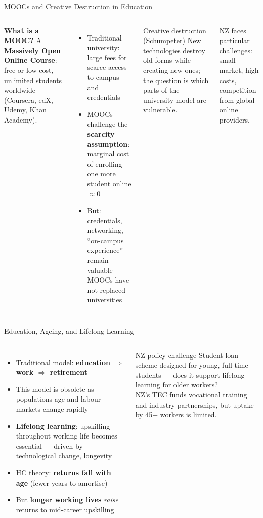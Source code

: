 \documentclass[aspectratio=169, 12pt]{beamer}
\begin{document}
\begin{frame}{MOOCs and Creative Destruction in Education}
  \begin{columns}
      \footnotesize \textbf{What is a MOOC?} A \textbf{Massively Open Online Course}: free or
      low-cost, unlimited students worldwide (Coursera, edX, Udemy, Khan Academy).
      \begin{itemize}
        \item Traditional university: large fees for scarce access to campus and credentials
        \item MOOCs challenge the \textbf{scarcity assumption}: marginal cost of enrolling
              one more student online $\approx 0$
        \item But: credentials, networking, ``on-campus experience'' remain valuable ---
              MOOCs have not replaced universities
      \end{itemize}
      \begin{alertblock}{Creative destruction (Schumpeter)}
        \footnotesize New technologies destroy old forms while creating new ones; the question is
        which parts of the university model are vulnerable.
      \end{alertblock}
      \vspace{0.2em}
      \footnotesize NZ faces particular challenges: small market, high costs, competition
      from global online providers.
  \end{columns}
\end{frame}

\begin{frame}{Education, Ageing, and Lifelong Learning}
  \begin{columns}
      \footnotesize
      \begin{itemize}
        \item Traditional model: \textbf{education $\Rightarrow$ work $\Rightarrow$ retirement}
        \item This model is obsolete as populations age and labour markets change rapidly
        \item \textbf{Lifelong learning}: upskilling throughout working life becomes essential
              --- driven by technological change, longevity
        \item HC theory: \textbf{returns fall with age} (fewer years to amortise)
        \item But \textbf{longer working lives} \emph{raise} returns to mid-career upskilling
      \end{itemize}
      \begin{alertblock}{NZ policy challenge}
        \footnotesize Student loan scheme designed for young, full-time students --- does it
        support lifelong learning for older workers?\\[0.2em]
        NZ's TEC funds vocational training and industry partnerships, but uptake by 45+
        workers is limited.
      \end{alertblock}
  \end{columns}
\end{frame}
\end{document}
